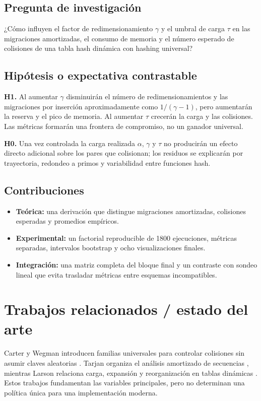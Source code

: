 \documentclass[11pt]{article}
\begin{document}
\subsection{Pregunta de investigación}
¿Cómo influyen el factor de redimensionamiento $\gamma$ y el umbral de carga $\tau$ en las migraciones amortizadas, el consumo de memoria y el número esperado de colisiones de una tabla hash dinámica con hashing universal?

\subsection{Hipótesis o expectativa contrastable}
\textbf{H1.} Al aumentar $\gamma$ disminuirán el número de redimensionamientos y las migraciones por inserción aproximadamente como $1/(\gamma-1)$, pero aumentarán la reserva y el pico de memoria. Al aumentar $\tau$ crecerán la carga y las colisiones. Las métricas formarán una frontera de compromiso, no un ganador universal.

\textbf{H0.} Una vez controlada la carga realizada $\alpha$, $\gamma$ y $\tau$ no producirán un efecto directo adicional sobre los pares que colisionan; los residuos se explicarán por trayectoria, redondeo a primos y variabilidad entre funciones hash.

\subsection{Contribuciones}
\begin{itemize}[leftmargin=1.5em]
\item \textbf{Teórica:} una derivación que distingue migraciones amortizadas, colisiones esperadas y promedios empíricos.
\item \textbf{Experimental:} un factorial reproducible de 1800 ejecuciones, métricas separadas, intervalos bootstrap y ocho visualizaciones finales.
\item \textbf{Integración:} una matriz completa del bloque final y un contraste con sondeo lineal que evita trasladar métricas entre esquemas incompatibles.
\end{itemize}

\section{Trabajos relacionados / estado del arte}
Carter y Wegman introducen familias universales para controlar colisiones sin asumir claves aleatorias \cite{CarterWegman1979}. Tarjan organiza el análisis amortizado de secuencias \cite{Tarjan1985}, mientras Larson relaciona carga, expansión y reorganización en tablas dinámicas \cite{Larson1988}. Estos trabajos fundamentan las variables principales, pero no determinan una política única para una implementación moderna.
\end{document}

